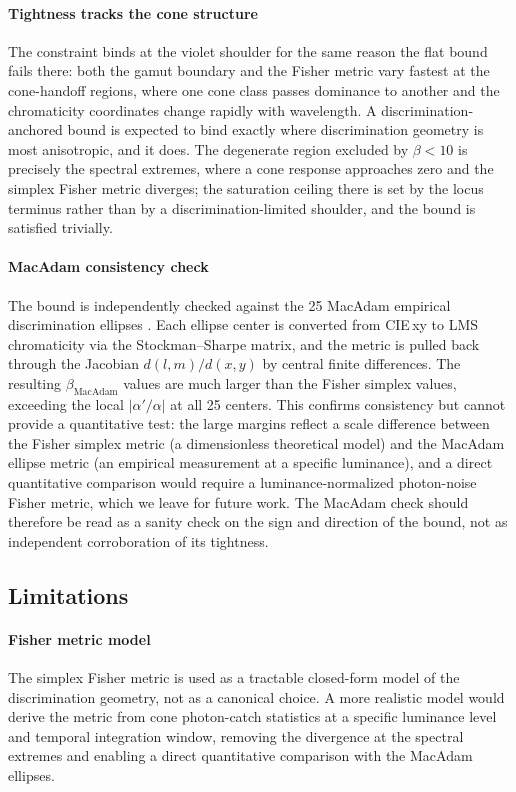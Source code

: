 \documentclass[preprint,12pt,authoryear]{elsarticle}
\theoremstyle{plain}
\theoremstyle{definition}
\theoremstyle{remark}
\begin{document}
\paragraph{Tightness tracks the cone structure}
The constraint binds at the violet shoulder for the same reason the flat bound fails there: both the gamut boundary and the Fisher metric vary fastest at the cone-handoff regions, where one cone class passes dominance to another and the chromaticity coordinates change rapidly with wavelength. A discrimination-anchored bound is expected to bind exactly where discrimination geometry is most anisotropic, and it does. The degenerate region excluded by $\beta<10$ is precisely the spectral extremes, where a cone response approaches zero and the simplex Fisher metric diverges; the saturation ceiling there is set by the locus terminus rather than by a discrimination-limited shoulder, and the bound is satisfied trivially.

\paragraph{MacAdam consistency check}
The bound is independently checked against the 25 MacAdam empirical discrimination ellipses \citep{MacAdam1942}. Each ellipse center is converted from CIE\,xy to LMS chromaticity via the Stockman--Sharpe matrix, and the metric is pulled back through the Jacobian $d(l,m)/d(x,y)$ by central finite differences. The resulting $\beta_{\mathrm{MacAdam}}$ values are much larger than the Fisher simplex values, exceeding the local $|\alpha'/\alpha|$ at all 25 centers. This confirms consistency but cannot provide a quantitative test: the large margins reflect a scale difference between the Fisher simplex metric (a dimensionless theoretical model) and the MacAdam ellipse metric (an empirical measurement at a specific luminance), and a direct quantitative comparison would require a luminance-normalized photon-noise Fisher metric, which we leave for future work. The MacAdam check should therefore be read as a sanity check on the sign and direction of the bound, not as independent corroboration of its tightness.

\subsection{Limitations}
\label{app:subsec:limitations}

\paragraph{Fisher metric model}
The simplex Fisher metric \citep{Rao1945} is used as a tractable closed-form model of the discrimination geometry, not as a canonical choice. A more realistic model would derive the metric from cone photon-catch statistics at a specific luminance level and temporal integration window, removing the divergence at the spectral extremes and enabling a direct quantitative comparison with the MacAdam ellipses.
\end{document}
